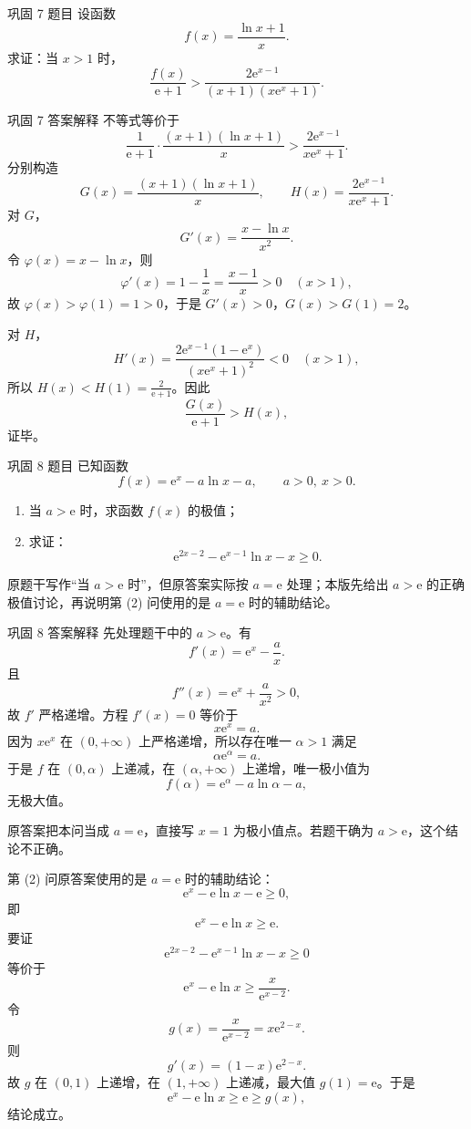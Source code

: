 ﻿\documentclass[aspectratio=169,10pt]{ctexbeamer}
\newcommand{\e}{\mathrm e}
\newcommand{\auditnote}[1]{\par\medskip{\color{Warn}\bfseries 原答案疏漏/补充：}#1}
\newcommand{\ocrnote}[1]{\par\medskip{\color{Warn}\bfseries 原文校验说明：}#1}
\begin{document}
\begin{frame}{巩固 7 题目}
\small
设函数
\[
f(x)=\frac{\ln x+1}{x}.
\]
求证：当 $x>1$ 时，
\[
\frac{f(x)}{\e+1}>
\frac{2\e^{x-1}}{(x+1)(x\e^x+1)}.
\]
\end{frame}

\begin{frame}[allowframebreaks]{巩固 7 答案解释}
\small
不等式等价于
\[
\frac1{\e+1}\cdot\frac{(x+1)(\ln x+1)}x
>
\frac{2\e^{x-1}}{x\e^x+1}.
\]
分别构造
\[
G(x)=\frac{(x+1)(\ln x+1)}x,\qquad
H(x)=\frac{2\e^{x-1}}{x\e^x+1}.
\]
对 $G$，
\[
G'(x)=\frac{x-\ln x}{x^2}.
\]
令 $\varphi(x)=x-\ln x$，则
\[
\varphi'(x)=1-\frac1x=\frac{x-1}x>0\quad(x>1),
\]
故 $\varphi(x)>\varphi(1)=1>0$，于是 $G'(x)>0$，$G(x)>G(1)=2$。

对 $H$，
\[
H'(x)=\frac{2\e^{x-1}(1-\e^x)}{(x\e^x+1)^2}<0\quad(x>1),
\]
所以 $H(x)<H(1)=\frac2{\e+1}$。因此
\[
\frac{G(x)}{\e+1}>H(x),
\]
证毕。
\end{frame}

\begin{frame}{巩固 8 题目}
\small
已知函数
\[
f(x)=\e^x-a\ln x-a,\qquad a>0,\ x>0.
\]
\begin{enumerate}
  \item 当 $a>\e$ 时，求函数 $f(x)$ 的极值；
  \item 求证：
  \[
  \e^{2x-2}-\e^{x-1}\ln x-x\ge0.
  \]
\end{enumerate}
\ocrnote{原题干写作“当 $a>\e$ 时”，但原答案实际按 $a=\e$ 处理；本版先给出 $a>\e$ 的正确极值讨论，再说明第 (2) 问使用的是 $a=\e$ 时的辅助结论。}
\end{frame}

\begin{frame}[allowframebreaks]{巩固 8 答案解释}
\small
先处理题干中的 $a>\e$。有
\[
f'(x)=\e^x-\frac ax.
\]
且
\[
f''(x)=\e^x+\frac a{x^2}>0,
\]
故 $f'$ 严格递增。方程 $f'(x)=0$ 等价于
\[
x\e^x=a.
\]
因为 $x\e^x$ 在 $(0,+\infty)$ 上严格递增，所以存在唯一 $\alpha>1$ 满足
\[
\alpha\e^\alpha=a.
\]
于是 $f$ 在 $(0,\alpha)$ 上递减，在 $(\alpha,+\infty)$ 上递增，唯一极小值为
\[
f(\alpha)=\e^\alpha-a\ln\alpha-a,
\]
无极大值。

\auditnote{原答案把本问当成 $a=\e$，直接写 $x=1$ 为极小值点。若题干确为 $a>\e$，这个结论不正确。}

\framebreak

第 (2) 问原答案使用的是 $a=\e$ 时的辅助结论：
\[
\e^x-\e\ln x-\e\ge0,
\]
即
\[
\e^x-\e\ln x\ge\e.
\]
要证
\[
\e^{2x-2}-\e^{x-1}\ln x-x\ge0
\]
等价于
\[
\e^x-\e\ln x\ge \frac{x}{\e^{x-2}}.
\]
令
\[
g(x)=\frac{x}{\e^{x-2}}=x\e^{2-x}.
\]
则
\[
g'(x)=(1-x)\e^{2-x}.
\]
故 $g$ 在 $(0,1)$ 上递增，在 $(1,+\infty)$ 上递减，最大值 $g(1)=\e$。于是
\[
\e^x-\e\ln x\ge\e\ge g(x),
\]
结论成立。
\end{frame}
\end{document}
